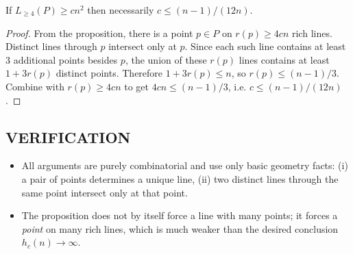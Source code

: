 \begin{corollary}
If $L_{\ge 4}(P)\ge c n^2$ then necessarily $c\le (n-1)/(12n)$.
\end{corollary}

\begin{proof}
From the proposition, there is a point $p\in P$ on $r(p)\ge 4c n$ rich lines.
Distinct lines through $p$ intersect only at $p$.
Since each such line contains at least 3 additional points besides $p$, the union of these $r(p)$ lines contains at least $1+3r(p)$ distinct points.
Therefore $1+3r(p)\le n$, so $r(p)\le (n-1)/3$.
Combine with $r(p)\ge 4c n$ to get $4c n\le (n-1)/3$, i.e. $c\le (n-1)/(12n)$.
\end{proof}

\subsection*{VERIFICATION}
\begin{itemize}[leftmargin=2em]
\item All arguments are purely combinatorial and use only basic geometry facts: (i) a pair of points determines a unique line, (ii) two distinct lines through the same point intersect only at that point.
\item The proposition does not by itself force a line with many points; it forces a \emph{point} on many rich lines, which is much weaker than the desired conclusion $h_c(n)\to\infty$.
\end{itemize}

